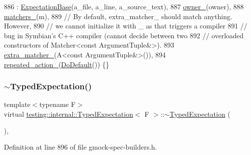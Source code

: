 \begin{DoxyCode}
886       : \hyperlink{classtesting_1_1internal_1_1ExpectationBase_a8c82a7ecad5831a3ce5ce8cc56ae172d}{ExpectationBase}(a\_file, a\_line, a\_source\_text),
887         \hyperlink{classtesting_1_1internal_1_1TypedExpectation_ab31ce65e492f93cb7c8cd676eb64d5fa}{owner\_}(owner),
888         \hyperlink{classtesting_1_1internal_1_1TypedExpectation_a40c442a0e8fffc8bf94611a8130998bf}{matchers\_}(m),
889         \textcolor{comment}{// By default, extra\_matcher\_ should match anything.  However,}
890         \textcolor{comment}{// we cannot initialize it with \_ as that triggers a compiler}
891         \textcolor{comment}{// bug in Symbian's C++ compiler (cannot decide between two}
892         \textcolor{comment}{// overloaded constructors of Matcher<const ArgumentTuple&>).}
893         \hyperlink{classtesting_1_1internal_1_1TypedExpectation_a7d2fef3d4429a3a350282e6030a45ba4}{extra\_matcher\_}(A<const ArgumentTuple&>()),
894         \hyperlink{classtesting_1_1internal_1_1TypedExpectation_ac0ec406bd08a2260ede55650b3e16a62}{repeated\_action\_}(\hyperlink{namespacetesting_ae041df61ff61ccb9753ba15b4309e1a6}{DoDefault}()) \{\}
\end{DoxyCode}
\mbox{\label{classtesting_1_1internal_1_1TypedExpectation_a4d73d7edd81f1b1418a33931fe728158}} 
\subsubsection{\texorpdfstring{$\sim$\+Typed\+Expectation()}{~TypedExpectation()}}
{\footnotesize\ttfamily template$<$typename F$>$ \\
virtual \hyperlink{classtesting_1_1internal_1_1TypedExpectation}{testing\+::internal\+::\+Typed\+Expectation}$<$ F $>$\+::$\sim$\hyperlink{classtesting_1_1internal_1_1TypedExpectation}{Typed\+Expectation} (\begin{DoxyParamCaption}{ }\end{DoxyParamCaption})\hspace{0.3cm}{\ttfamily [inline]}, {\ttfamily [virtual]}}



Definition at line 896 of file gmock-\/spec-\/builders.\+h.


